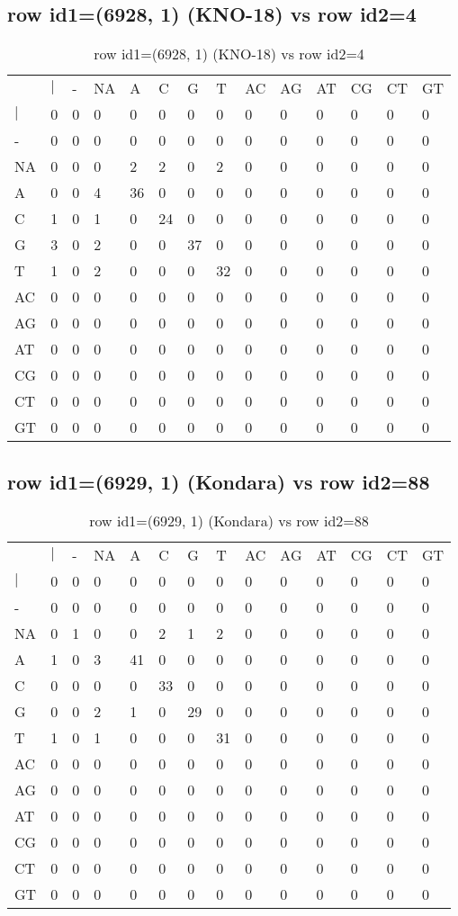 \subsection{row id1=(6928, 1) (KNO-18) vs row id2=4}
\begin{center}
\begin{longtable}{|l|l|l|l|l|l|l|l|l|l|l|l|l|l|}
\caption{row id1=(6928, 1) (KNO-18) vs row id2=4} \label{table_dm122}\\
\hline
\\
\hline
&$|$&-&NA&A&C&G&T&AC&AG&AT&CG&CT&GT\\
$|$&0&0&0&0&0&0&0&0&0&0&0&0&0\\
-&0&0&0&0&0&0&0&0&0&0&0&0&0\\
NA&0&0&0&2&2&0&2&0&0&0&0&0&0\\
A&0&0&4&36&0&0&0&0&0&0&0&0&0\\
C&1&0&1&0&24&0&0&0&0&0&0&0&0\\
G&3&0&2&0&0&37&0&0&0&0&0&0&0\\
T&1&0&2&0&0&0&32&0&0&0&0&0&0\\
AC&0&0&0&0&0&0&0&0&0&0&0&0&0\\
AG&0&0&0&0&0&0&0&0&0&0&0&0&0\\
AT&0&0&0&0&0&0&0&0&0&0&0&0&0\\
CG&0&0&0&0&0&0&0&0&0&0&0&0&0\\
CT&0&0&0&0&0&0&0&0&0&0&0&0&0\\
GT&0&0&0&0&0&0&0&0&0&0&0&0&0\\
\hline
\end{longtable}
\end{center}

\subsection{row id1=(6929, 1) (Kondara) vs row id2=88}
\begin{center}
\begin{longtable}{|l|l|l|l|l|l|l|l|l|l|l|l|l|l|}
\caption{row id1=(6929, 1) (Kondara) vs row id2=88} \label{table_dm124}\\
\hline
\\
\hline
&$|$&-&NA&A&C&G&T&AC&AG&AT&CG&CT&GT\\
$|$&0&0&0&0&0&0&0&0&0&0&0&0&0\\
-&0&0&0&0&0&0&0&0&0&0&0&0&0\\
NA&0&1&0&0&2&1&2&0&0&0&0&0&0\\
A&1&0&3&41&0&0&0&0&0&0&0&0&0\\
C&0&0&0&0&33&0&0&0&0&0&0&0&0\\
G&0&0&2&1&0&29&0&0&0&0&0&0&0\\
T&1&0&1&0&0&0&31&0&0&0&0&0&0\\
AC&0&0&0&0&0&0&0&0&0&0&0&0&0\\
AG&0&0&0&0&0&0&0&0&0&0&0&0&0\\
AT&0&0&0&0&0&0&0&0&0&0&0&0&0\\
CG&0&0&0&0&0&0&0&0&0&0&0&0&0\\
CT&0&0&0&0&0&0&0&0&0&0&0&0&0\\
GT&0&0&0&0&0&0&0&0&0&0&0&0&0\\
\hline
\end{longtable}
\end{center}


